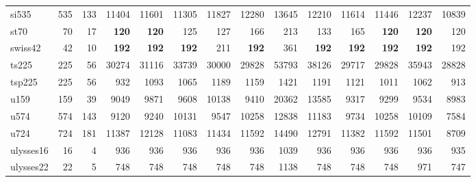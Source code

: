 {\begin{longtable}{l r r r r r r r r r r r r r}
si535 & 535 & 133 & 11404 & 11601 & 11305 & 11827 & 12280 & 13645 & 12210 & 11614 & 11446 & 12237 & 10839 \\
st70 & 70 & 17 & \textbf{120} & \textbf{120} & 125 & 127 & 166 & 213 & 133 & 165 & \textbf{120} & \textbf{120} & 120 \\
swiss42 & 42 & 10 & \textbf{192} & \textbf{192} & \textbf{192} & 211 & \textbf{192} & 361 & \textbf{192} & \textbf{192} & \textbf{192} & \textbf{192} & 192 \\
ts225 & 225 & 56 & 30274 & 31116 & 33739 & 30000 & 29828 & 53793 & 38126 & 29717 & 29828 & 35943 & 28828 \\
tsp225 & 225 & 56 & 932 & 1093 & 1065 & 1189 & 1159 & 1421 & 1191 & 1121 & 1011 & 1062 & 913 \\
u159 & 159 & 39 & 9049 & 9871 & 9608 & 10138 & 9410 & 20362 & 13585 & 9317 & 9299 & 9534 & 8983 \\
u574 & 574 & 143 & 9120 & 9240 & 10131 & 9547 & 10258 & 12838 & 11183 & 9734 & 10258 & 10109 & 7584 \\
u724 & 724 & 181 & 11387 & 12128 & 11083 & 11434 & 11592 & 14490 & 12791 & 11382 & 11592 & 11501 & 8709 \\
ulysses16 & 16 & 4 & 936 & 936 & 936 & 936 & 936 & 1039 & 936 & 936 & 936 & 936 & 935 \\
ulysses22 & 22 & 5 & 748 & 748 & 748 & 748 & 748 & 1138 & 748 & 748 & 748 & 971 & 747 \\
\end{longtable}}